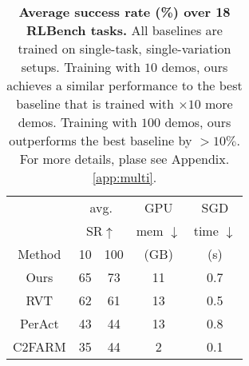 \begin{table}
\centering
\scriptsize
\begin{tabular}{ccccc}
\toprule
       & \multicolumn{2}{c}{avg.}           & GPU               & SGD                   \\
       & \multicolumn{2}{c}{SR$\uparrow$}   & mem $\downarrow$  & time $\downarrow$     \\ \rule{0pt}{3ex} 
Method & 10 & 100                           & (GB)              & (s)    \\ \midrule
Ours  & 65 & 73                           & 11              & 0.7          \\
RVT   & 62 & 61                           & 13              & 0.5      \\
PerAct & 43 & 44                          & 13              & 0.8        \\
C2FARM & 35 & 44                          & 2               & 0.1      \\ 
\bottomrule
\end{tabular}
\caption{\textbf{Average success rate (\%) over 18 RLBench tasks.}  All baselines are trained on single-task, single-variation setups. Training with $10$ demos, ours achieves a similar performance to the best baseline that is trained with $\times 10$ more demos. Training with $100$ demos, ours outperforms the best baseline by $>10\%$. For more details, plase see Appendix.\ref{app:multi}.}

\label{table:rlbench18}
\end{table}